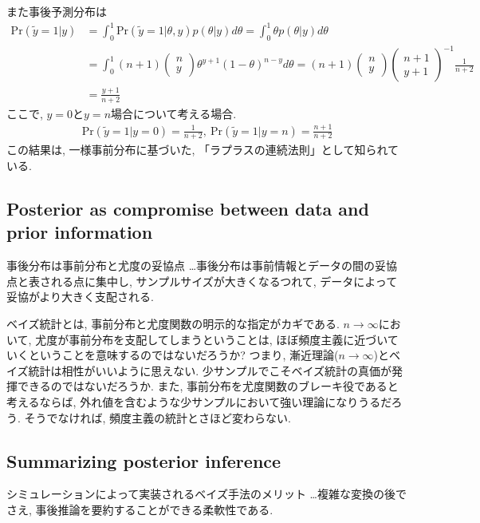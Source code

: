 \documentclass[11pt,a4pape,dvipdfmx]{jarticle}
\newcommand{\eqn}[1]{\begin{align*}#1\end{align*}}
\begin{document}
また事後予測分布は
\eqn{\text{Pr}(\tilde{y}=1|y)&=\int_0^1 \text{Pr}(\tilde{y}=1|\theta,y)p(\theta|y)d\theta=\int_0^1 \theta p(\theta|y)d\theta\\
&=\int_0^1(n+1) \left(\begin{array}{c}n\\y\end{array}\right)\theta^{y+1}(1-\theta)^{n-y}d\theta=(n+1)\left(\begin{array}{c}n\\y\end{array}\right)\left(\begin{array}{c}n+1\\y+1\end{array}\right)^{-1} \frac{1}{n+2}\\
&=\frac{y+1}{n+2}}
ここで, $y=0$と$y=n$場合について考える場合.
\eqn{\text{Pr}(\tilde{y}=1|y=0)=\frac{1}{n+2},\ \text{Pr}(\tilde{y}=1|y=n)=\frac{n+1}{n+2}}
この結果は, 一様事前分布に基づいた, 「ラプラスの連続法則」として知られている.


\subsection{Posterior as compromise between data and prior information}
\begin{itembox}[l]{事後分布は事前分布と尤度の妥協点}
…事後分布は事前情報とデータの間の妥協点と表される点に集中し, サンプルサイズが大きくなるつれて, データによって妥協がより大きく支配される.
\end{itembox}

ベイズ統計とは, 事前分布と尤度関数の明示的な指定がカギである.
$n\rightarrow \infty$において, 尤度が事前分布を支配してしまうということは, ほぼ頻度主義に近づいていくということを意味するのではないだろうか?
つまり, 漸近理論($n\rightarrow \infty$)とベイズ統計は相性がいいように思えない.
少サンプルでこそベイズ統計の真価が発揮できるのではないだろうか.
また, 事前分布を尤度関数のブレーキ役であると考えるならば, 外れ値を含むような少サンプルにおいて強い理論になりうるだろう.
そうでなければ, 頻度主義の統計とさほど変わらない.

\subsection{Summarizing posterior inference}
\begin{itembox}[l]{シミュレーションによって実装されるベイズ手法のメリット}
…複雑な変換の後でさえ, 事後推論を要約することができる柔軟性である.
\end{itembox}
\end{document}
